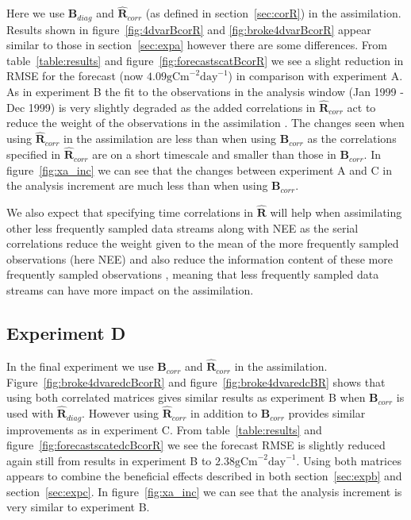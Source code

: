 \documentclass[review]{elsarticle}
\begin{document}
Here we use $\textbf{B}_{diag}$ and $\hat{\textbf{R}}_{corr}$ (as defined in section~\ref{sec:corR}) in the assimilation. Results shown in figure~\ref{fig:4dvarBcorR} and \ref{fig:broke4dvarBcorR} appear similar to those in section~\ref{sec:expa} however there are some differences. From table~\ref{table:results} and figure~\ref{fig:forecastscatBcorR} we see a slight reduction in RMSE for the forecast (now $4.09 \text{gCm}^{-2}\text{day}^{-1}$) in comparison with experiment A. As in experiment B the fit to the observations in the analysis window (Jan 1999 - Dec 1999) is very slightly degraded as the added correlations in $\hat{\textbf{R}}_{corr}$ act to reduce the weight of the observations in the assimilation \citep{jarvinen1999variational}. The changes seen when using $\hat{\textbf{R}}_{corr}$ in the assimilation are less than when using $\textbf{B}_{corr}$ as the correlations specified in $\hat{\textbf{R}}_{corr}$ are on a short timescale and smaller than those in $\textbf{B}_{corr}$. In figure~\ref{fig:xa_inc} we can see that the changes between experiment A and C in the analysis increment are much less than when using $\textbf{B}_{corr}$.  

We also expect that specifying time correlations in $\hat{\textbf{R}}$ will help when assimilating other less frequently sampled data streams along with NEE as the serial correlations reduce the weight given to the mean of the more frequently sampled observations (here NEE) and also reduce the information content of these more frequently sampled observations \citep{jarvinen1999variational, Daley1992}, meaning that less frequently sampled data streams can have more impact on the assimilation.

\subsection{Experiment D}

In the final experiment we use $\textbf{B}_{corr}$ and $\hat{\textbf{R}}_{corr}$ in the assimilation. Figure~\ref{fig:broke4dvaredcBcorR} and figure~\ref{fig:broke4dvaredcBR} shows that using both correlated matrices gives similar results as experiment B when $\textbf{B}_{corr}$ is used with $\hat{\textbf{R}}_{diag}$. However using $\hat{\textbf{R}}_{corr}$ in addition to $\textbf{B}_{corr}$ provides similar improvements as in experiment C. From table~\ref{table:results} and figure~\ref{fig:forecastscatedcBcorR} we see the forecast RMSE is slightly reduced again still from results in experiment B to $2.38 \text{gCm}^{-2}\text{day}^{-1}$. Using both matrices appears to combine the beneficial effects described in both section~\ref{sec:expb} and section~\ref{sec:expc}. In figure~\ref{fig:xa_inc} we can see that the analysis increment is very similar to experiment B.
\end{document}
